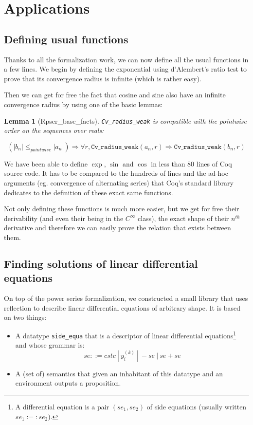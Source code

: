 \documentclass[submission,copyright]{eptcs}
\newcommand{\cvrw}{\texttt{Cv\_radius\_weak}}
\newtheorem{lemma}{Lemma}
\begin{document}
\section{Applications}

\subsection{Defining usual functions}

Thanks to all the formalization work, we can now define all the usual
functions in a few lines. We begin by defining the exponential using
d'Alembert's ratio test to prove that its convergence radius is infinite
(which is rather easy).

Then we can get for free the fact that cosine and sine also have an
infinite convergence radius by using one of the basic lemmas:

\begin{lemma}[Rpser\_base\_facts] \cvrw{} is compatible with the
pointwise order on the sequences over reals:

$$\left(\left|b_n\right| \le_{pointwise} \left|a_n\right|\right)
  \Rightarrow \forall r, \cvrw{}(a_n,r) \Rightarrow \cvrw{}(b_n,r)$$
\end{lemma}

We have been able to define $\exp$, $\sin$ and $\cos$ in less than 80
lines of Coq source code. It has to be compared to the hundreds
of lines and the ad-hoc arguments (eg. convergence of alternating series)
that Coq's standard library dedicates to the definition of these exact
same functions.

Not only defining these functions is much more easier, but we get for
free their derivability (and even their being in the $C^{\infty}$ class),
the exact shape of their $n^{th}$ derivative and therefore we can easily
prove the relation that exists between them.

\subsection{Finding solutions of linear differential equations}

On top of the power series formalization, we constructed a small library
that uses reflection to describe linear differential equations of
arbitrary shape. It is based on two things:

\begin{itemize}
 \item A datatype \texttt{side\_equa} that is a descriptor of linear 
   differential equations\footnote{A differential equation is a pair
   $(se_1,se_2)$ of side equations (usually written $se_1 :=: se_2$).} and whose grammar is:
	$$se ::= cst c ~|~ y_{i}^{(k)} ~|~ - se ~|~ se + se$$

 \item A (set of) semantics that given an inhabitant of this datatype
	and an environment outputs a proposition.
\end{itemize}
\end{document}
